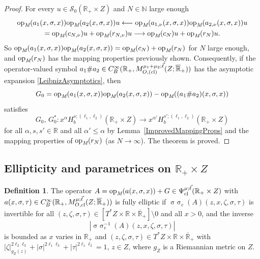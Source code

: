 \documentclass[reqno]{amsart}
\numberwithin{equation}{section}
\theoremstyle{definition}
\newtheorem{definition}[equation]{Definition}
\def\N{\mathbb N}
\def\R{\mathbb R}
\def\S{\mathscr S}
\def\opm{\textup{op}_{\textit{M}}}
\DeclareMathOperator{\sym}{ \sigma\!\!\!\sigma}
\begin{document}
\begin{proof}
For every $u \in \S_0(\R_+\times Z)$ and $N \in \N$ large enough
\begin{gather*}
\opm(a_1(x,\sigma,x))\opm(a_2(x,\sigma,x))u \longleftarrow \opm(a_{1,\nu}(x,\sigma,x))\opm(a_{2,\nu}(x,\sigma,x))u \\
= \opm(c_{N,\nu})u + \opm(r_{N,\nu})u \longrightarrow \opm(c_N)u + \opm(r_N)u.
\end{gather*}
So $\opm(a_1(x,\sigma,x))\opm(a_2(x,\sigma,x)) = \opm(c_N) + \opm(r_N)$ for $N$ large enough, and $\opm(r_N)$ has the mapping properties previously shown. Consequently, if the operator-valued symbol $a_1{\#}a_2 \in C^{\infty}_B(\R_+,M^{\mu_1+\mu_2;\vec{\ell}}_{O,\textup{(cl)}}(Z;\overline{\R}_+))$ has the asymptotic expansion \eqref{LeibnizAsymptotics}, then
$$
G_0 = \opm(a_1(x,\sigma,x))\opm(a_2(x,\sigma,x)) - \opm((a_1{\#}a_2)(x,\sigma,x))
$$
satisfies
$$
G_0,\,G_0^* : x^{\alpha}H^{s;(\ell_1,\ell_2)}_b(\R_+\times Z) \to x^{\alpha'}H^{s';(\ell_1,\ell_2)}_b(\R_+\times Z)
$$
for all $\alpha,s,s' \in \R$ and all $\alpha' \leq \alpha$ by Lemma~\ref{ImprovedMappingProps} and the mapping properties of $\opm(r_N)$ (as $N \to \infty$). The theorem is proved.
\end{proof}

\subsection{Ellipticity and parametrices on {\boldmath ${\mathbb R}_+\times Z$}}

\begin{definition}
The operator $A = \opm(a(x,\sigma,x)) + G \in \Psi^{\mu;\vec{\ell}}_{\textup{cl}}(\R_+\times Z)$ with $a(x,\sigma,\tau) \in C^{\infty}_B(\R_+,M^{\mu;\vec{\ell}}_{O,\textup{cl}}(Z;\overline{\R}_+))$ is fully elliptic if $\sym_e(A)(z,x,\zeta,\sigma,\tau)$ is invertible for all $(z,\zeta,\sigma,\tau) \in [T^*Z \times \R \times \overline{\R}_+] \setminus 0$ and all $x > 0$, and the inverse
$$
|\sym^{-1}_e(A)(z,x,\zeta,\sigma,\tau)|
$$
is bounded as $x$ varies in $\R_+$ and $(z,\zeta,\sigma,\tau) \in T^*Z \times \R \times \overline{\R}_+$ with $|\zeta|_{g_Z(z)}^{2\ell_2\ell_3} + |\sigma|^{2\ell_1\ell_3} + |\tau|^{2\ell_1\ell_2} = 1$, $z \in Z$, where $g_Z$ is a Riemannian metric on $Z$.
\end{definition}
\end{document}
